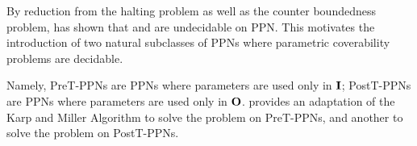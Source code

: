 By reduction from the halting problem as well as the counter boundedness problem, \cite{David17} has shown that \Ucov and \Ecov are undecidable on \ac{PPN}.
This motivates the introduction of two natural subclasses of \acp{PPN} where parametric coverability problems are decidable.

Namely,
PreT-PPNs are \acp{PPN} where parameters are used only in $\mathbf{I}$;
PostT-PPNs are \acp{PPN} where parameters are used only in $\mathbf{O}$.
\cite{David17} provides an adaptation of the Karp and Miller Algorithm to solve the \Ucov problem on PreT-\acp{PPN}, and another to solve the \Ecov problem on PostT-\acp{PPN}.

